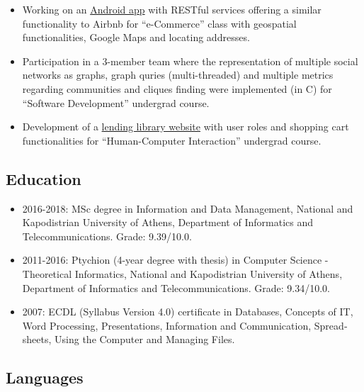 \documentclass[a4paper,oneside,10pt]{article}
\begin{document}
\begin{itemize}
\begin{sloppypar}
\end{sloppypar}

\item Working on an \href{https://www.dropbox.com/sh/46dg71devshdvv1/AAAvynY_ZJJcsGwdC6ZGsQg5a?dl=0}{Android app} with RESTful services offering a similar functionality to Airbnb for ``e-Commerce'' class with geospatial functionalities, Google Maps and locating addresses.

\item Participation in a 3-member team where the representation of multiple social networks as graphs, graph quries (multi-threaded) and multiple metrics regarding communities and cliques finding were implemented (in C) for ``Software Development'' undergrad course.

\item Development of a \href{http://dl104.madgik.di.uoa.gr/eamgroup56/index.php}{lending library website} with user roles and shopping cart functionalities for ``Human-Computer Interaction'' undergrad course.

\end{itemize}

\subsection*{Education}

\begin{itemize}

\item 2016-2018: MSc degree in Information and Data Management, National and Kapodistrian University of Athens, Department of Informatics and Telecommunications. Grade: 9.39/10.0.

\item 2011-2016: Ptychion (4-year degree with thesis) in Computer Science - Theoretical Informatics, National and Kapodistrian University of Athens, Department of Informatics and Telecommunications. Grade: 9.34/10.0.

\item 2007: \textlatin{ECDL (Syllabus Version 4.0)} certificate in \textlatin{Databases, Concepts of IT, Word Processing, Presentations, Information and Communication, Spreadsheets, Using the Computer and Managing Files}.

\end{itemize}

\subsection*{Languages}
\end{document}
